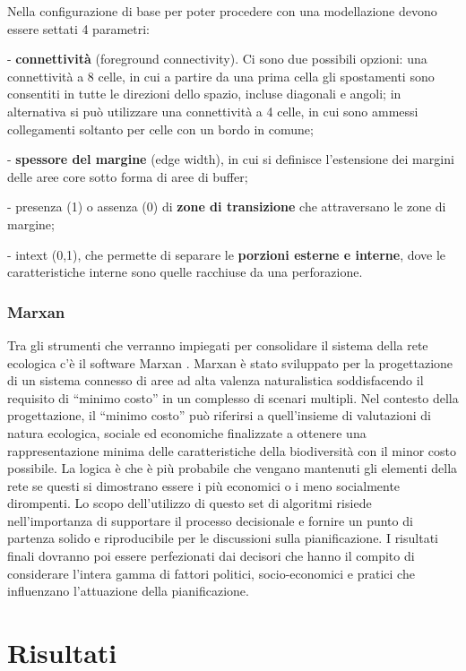 \documentclass[
  a4paper,
]{book}
\begin{document}
Nella configurazione di base per poter procedere con una modellazione devono essere settati 4 parametri:

- \textbf{connettività} (foreground connectivity).
Ci sono due possibili opzioni: una connettività a 8 celle, in cui a partire da una prima cella gli spostamenti sono consentiti in tutte le direzioni dello spazio, incluse diagonali e angoli; in alternativa si può utilizzare una connettività a 4 celle, in cui sono ammessi collegamenti soltanto per celle con un bordo in comune;

- \textbf{spessore del margine} (edge width), in cui si definisce l'estensione dei margini delle aree core sotto forma di aree di buffer;

- presenza (1) o assenza (0) di \textbf{zone di transizione} che attraversano le zone di margine;

- intext (0,1), che permette di separare le \textbf{porzioni esterne e interne}, dove le caratteristiche interne sono quelle racchiuse da una perforazione.

\subsection{Marxan}\label{marxan}

Tra gli strumenti che verranno impiegati per consolidare il sistema della rete ecologica c'è il software Marxan \citep{ardronMarxanGoodPractices2010}.
Marxan è stato sviluppato per la progettazione di un sistema connesso di aree ad alta valenza naturalistica soddisfacendo il requisito di ``minimo costo'' in un complesso di scenari multipli.
Nel contesto della progettazione, il ``minimo costo'' può riferirsi a quell'insieme di valutazioni di natura ecologica, sociale ed economiche finalizzate a ottenere una rappresentazione minima delle caratteristiche della biodiversità con il minor costo possibile.
La logica è che è più probabile che vengano mantenuti gli elementi della rete se questi si dimostrano essere i più economici o i meno socialmente dirompenti.
Lo scopo dell'utilizzo di questo set di algoritmi risiede nell'importanza di supportare il processo decisionale e fornire un punto di partenza solido e riproducibile per le discussioni sulla pianificazione.
I risultati finali dovranno poi essere perfezionati dai decisori che hanno il compito di considerare l'intera gamma di fattori politici, socio-economici e pratici che influenzano l'attuazione della pianificazione.

\chapter{Risultati}\label{risultati}
\end{document}
